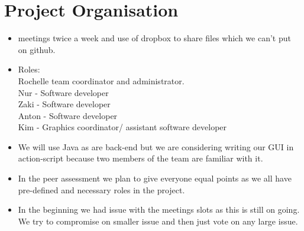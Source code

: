 \documentclass[11pt]{article}
\begin{document}
	\section{Project Organisation}
	\begin{itemize}
		\item meetings twice a week and use of dropbox to share files which we can't put on github. 
		\item Roles:\\
		Rochelle team coordinator and administrator. \\
		Nur - Software developer\\
		Zaki - Software developer \\
		Anton - Software developer \\
		Kim - Graphics coordinator/ assistant software developer  
	\end{itemize}
	\begin{itemize}
		
		\item We will use Java as are back-end but we are considering writing our GUI in action-script because two members of the team are familiar with it. 
		\item In the peer assessment we plan to give everyone equal points as we all have pre-defined and necessary roles in the project. 
		\item In the beginning we had issue with the meetings slots as this is still on going. We try to compromise on smaller issue and then just vote on any large issue.  
		
	\end{itemize}



	
\end{document}
